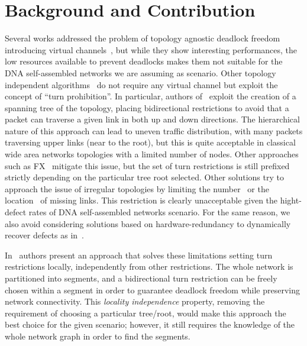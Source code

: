 \section{Background and Contribution}
\label{sec:related_works}
Several works addressed the problem of topology agnostic deadlock
freedom introducing virtual channels~\cite{sancho2002, skeie2002,
skeie2004, koibuchi2003}, but while they show interesting
performances, the low resources available to prevent deadlocks makes them not suitable for
the DNA self-assembled networks we are assuming as
scenario.
Other topology independent algorithms~\cite{schroeder1991,
koibuchi2001, cherkasova1996} do not require any virtual channel but
exploit the concept of ``turn prohibition''.
In particular, authors of~\cite{Patwardhan05evaluatingthe} exploit the creation of a spanning tree of the
topology, placing bidirectional restrictions to avoid that a packet
can traverse a given link in both up and down directions.
The hierarchical nature of this approach can lead to uneven traffic
distribution, with many packets traversing upper links (near to the
root), but this is quite acceptable in classical wide area networks
topologies with a limited number of nodes. Other approaches such as
FX~\cite{sancho2000} mitigate this
issue, but the set of turn restrictions is still prefixed
strictly depending on the particular tree root selected. 
Other solutions try to approach the issue of irregular
topologies by limiting the number~\cite{duato1997, gomez2004, koibuchi2008} or the
location~\cite{zhang2008, flich2008, liu2011} of missing links. This
restriction is clearly unacceptable given the hight-defect rates of
DNA self-assembled networks scenario. For the same reason, we also
avoid considering solutions based on hardware-redundancy to
dynamically recover defects as in~\cite{constantinides2006, kohler2010,  park2006, ebrahimi2013}. 

In~\cite{mejia_ipdps06} authors present an approach that solves these
limitations setting turn restrictions locally,
independently from other restrictions. The whole network is
partitioned into segments, and a bidirectional turn
restriction can be freely chosen within a segment in order to guarantee
deadlock freedom while preserving network connectivity. This \emph{locality
independence} property, removing the requirement of choosing a particular tree/root,
would make this approach the best choice for the given scenario;
however, it still requires the knowledge of the
whole network graph in order to find the segments.

